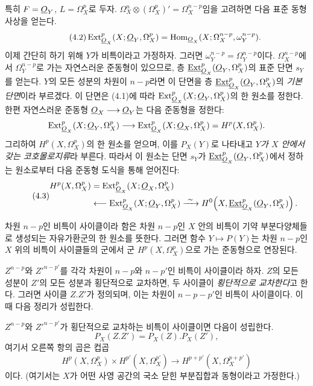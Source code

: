 특히 $F=\underline{O}_Y$, $L=\Omega_X^{p}$로 두자.
$\Omega_X^{n}\otimes(\Omega_X^{p})'=\Omega_X^{n-p}$임을 고려하면 다음 표준
동형사상을 얻는다.
\begin{equation}\tag{4.2}
  \operatorname{Ext}_{\underline{O}_X}^{p}(X;\underline{O}_Y,\Omega_X^{p})
  =\operatorname{Hom}_{\underline{O}_X}
  (X;\Omega_X^{n-p},\omega_Y^{n-p}).
\end{equation}
이제 간단히 하기 위해 $Y$가 비특이라고 가정하자. 그러면
$\omega_Y^{n-p}=\Omega_Y^{n-p}$이다. $\Omega_X^{n-p}$에서
$\Omega_Y^{n-p}$로 가는 자연스러운 준동형이 있으므로, 층
$\underline{\operatorname{Ext}}_{\underline{O}_X}^{p}(\underline{O}_Y,\Omega_X^{p})$의 표준 단면 $s_Y$를 얻는다.
$Y$의 모든 성분의 차원이 $n-p$라면 이 단면을 층
$\underline{\operatorname{Ext}}_{\underline{O}_X}^{p}(\underline{O}_Y,\Omega_X^{p})$의 \emph{기본 단면}이라 부르겠다.
이 단면은 (4.1)에 따라
$\operatorname{Ext}_{\underline{O}_X}^{p}(X;\underline{O}_Y,\Omega_X^{p})$의 한 원소를 정한다. 한편
자연스러운 준동형 $\underline{O}_X\longrightarrow\underline{O}_Y$는 다음 준동형을 정한다:
\[
  \operatorname{Ext}_{\underline{O}_X}^{p}(X;\underline{O}_Y,\Omega_X^{p})
  \longrightarrow
  \operatorname{Ext}_{\underline{O}_X}^{p}(X;\underline{O}_X,\Omega_X^{p})
  =H^{p}(X,\Omega_X^{p}).
\]
그리하여 $H^{p}(X,\Omega_X^{p})$의 한 원소를 얻으며, 이를 $P_X(Y)$로 나타내고
\emph{$Y$가 $X$ 안에서 갖는 코호몰로지류}라 부른다. 따라서 이 원소는 단면
$s_Y$가 $\underline{\operatorname{Ext}}_{\underline{O}_X}^{p}(\underline{O}_Y,\Omega_X^{p})$에서 정하는 원소로부터 다음
준동형 도식을 통해 얻어진다:
\begin{equation}\tag{4.3}
\begin{aligned}
H^{p}(X,\Omega_X^{p})
&=\operatorname{Ext}_{\underline{O}_X}^{p}(X;\underline{O}_X,\Omega_X^{p})\\
&\longleftarrow\operatorname{Ext}_{\underline{O}_X}^{p}(X;\underline{O}_Y,\Omega_X^{p})
\xrightarrow{\ \sim\ }
H^{0}\!\left(X,\underline{\operatorname{Ext}}_{\underline{O}_X}^{p}(\underline{O}_Y,\Omega_X^{p})\right).
\end{aligned}
\end{equation}

차원 $n-p$인 비특이 사이클이라 함은 차원 $n-p$인 $X$ 안의 비특이 기약
부분다양체들로 생성되는 자유가환군의 한 원소를 뜻한다. 그러면 함수
$Y\longmapsto P(Y)$는 차원 $n-p$인 $X$ 위의 비특이 사이클들의 군에서
군 $H^{p}(X,\Omega_X^{p})$으로 가는 준동형으로 연장된다.

$Z^{n-p}$와 $Z'^{n-p'}$를 각각 차원이 $n-p$와 $n-p'$인 비특이 사이클이라
하자. $Z$의 모든 성분이 $Z'$의 모든 성분과 횡단적으로 교차하면, 두 사이클이
\emph{횡단적으로 교차한다}고 한다. 그러면 사이클 $Z.Z'$가 정의되며, 이는
차원이 $n-p-p'$인 비특이 사이클이다. 이때 다음 정리가 성립한다.

 $Z^{n-p}$와 $Z'^{n-p'}$가 횡단적으로 교차하는 비특이
사이클이면 다음이 성립한다.
\begin{equation}\tag{4.4}
  P_X(Z.Z')=P_X(Z).P_X(Z'),
\end{equation}
여기서 오른쪽 항의 곱은 컵곱
\[
  H^{p}(X,\Omega_X^{p})\times H^{p'}(X,\Omega_X^{p'})
  \longrightarrow H^{p+p'}(X,\Omega_X^{p+p'})
\]
이다. (여기서는 $X$가 어떤 사영 공간의 국소 닫힌 부분집합과 동형이라고
가정한다.)

